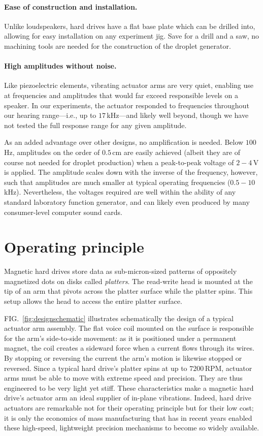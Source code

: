 \documentclass[aip,rsi,reprint,graphicx]{revtex4-1} %
\begin{document}
\paragraph*{Ease of construction and installation.} Unlike loudspeakers, hard
drives have a flat base plate which can be drilled into, allowing for easy
installation on any experiment jig. Save for a drill and a saw, no machining
tools are needed for the construction of the droplet generator.

\paragraph*{High amplitudes without noise.}
Like piezoelectric elements, vibrating actuator arms are very quiet, enabling
use at frequencies and amplitudes that would far exceed responsible levels on
a speaker.  In our experiments, the actuator responded to frequencies throughout
our hearing range---i.e., up to $17\,$kHz---and likely well beyond, though we
have not tested the full response range for any given amplitude.

As an added advantage over other designs, no amplification is needed. Below
$100\,$Hz, amplitudes on the order of $0.5\,$cm are easily achieved (albeit they
are of course not needed for droplet production) when a peak-to-peak voltage of
$2-4\,$V is applied. The amplitude scales down with the inverse of the frequency,
however, such that amplitudes are much smaller at typical operating frequencies
($0.5-10\,$kHz). Nevertheless, the voltages required are well within the ability
of any standard laboratory function generator, and can likely even produced by many
consumer-level computer sound cards.

\section{Operating principle}
Magnetic hard drives store data as sub-micron-sized patterns of 
oppositely magnetized dots on disks called \emph{platters}. The read-write head
is mounted at the tip of an arm that pivots across the platter surface while the
platter spins. This setup allows the head to access the entire platter surface.

FIG.~\ref{fig:designschematic} illustrates schematically the design of a typical
actuator arm assembly. The flat voice coil mounted on the surface is responsible
for the arm's side-to-side movement: as it is positioned under a permanent
magnet, the coil creates a sideward force when a current flows through its
wires. By stopping or reversing the current the arm's motion is likewise stopped
or reversed. Since a typical hard drive's platter spins at up to $7200\,$RPM,
actuator arms must be able to move with extreme speed and precision. They are
thus engineered to be very light yet stiff. These characteristics make a
magnetic hard drive's actuator arm an ideal supplier of in-plane vibrations.
Indeed, hard drive actuators are remarkable not for their operating principle
but for their low cost; it is only the economics of mass manufacturing that has
in recent years enabled these high-speed, lightweight precision mechanisms to
become so widely available.
\end{document}
